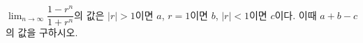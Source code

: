 $\displaystyle\lim_{n\to\infty}\dfrac{1-r^n}{1+r^n}$의 값은 $|r|>1$이면 $a$, $r=1$이면 $b$, $|r|<1$이면 $c$이다. 이때 $a+b-c$의 값을 구하시오. 
